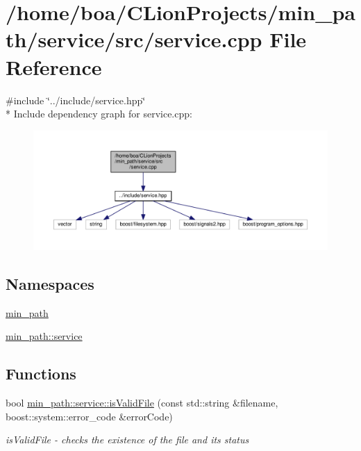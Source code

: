 \hypertarget{a00031}{}\section{/home/boa/\+C\+Lion\+Projects/min\+\_\+path/service/src/service.cpp File Reference}
\label{a00031}
{\ttfamily \#include \char`\"{}../include/service.\+hpp\char`\"{}}\\*
Include dependency graph for service.\+cpp\+:
\nopagebreak
\begin{figure}[H]
\begin{center}
\leavevmode
\includegraphics[width=350pt]{d1/d6f/a00063}
\end{center}
\end{figure}
\subsection*{Namespaces}
\begin{DoxyCompactItemize}
\item 
 \hyperlink{a00033}{min\+\_\+path}
\item 
 \hyperlink{a00037}{min\+\_\+path\+::service}
\end{DoxyCompactItemize}
\subsection*{Functions}
\begin{DoxyCompactItemize}
\item 
bool \hyperlink{a00037_a57c94e914d9aaa3af892f8a74f8b23a6_a57c94e914d9aaa3af892f8a74f8b23a6}{min\+\_\+path\+::service\+::is\+Valid\+File} (const std\+::string \&filename, boost\+::system\+::error\+\_\+code \&error\+Code)
\begin{DoxyCompactList}\small\item\em is\+Valid\+File -\/ checks the existence of the file and its status \end{DoxyCompactList}\end{DoxyCompactItemize}
